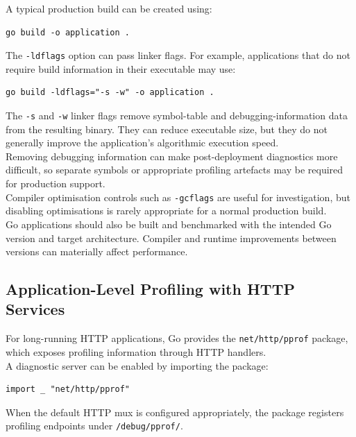 A typical production build can be created using:

\begin{lstlisting}
go build -o application .
\end{lstlisting}

The \texttt{-ldflags} option can pass linker flags. For example, applications that do not require build information in their executable may use:

\begin{lstlisting}
go build -ldflags="-s -w" -o application .
\end{lstlisting}

The \texttt{-s} and \texttt{-w} linker flags remove symbol-table and debugging-information data from the resulting binary. They can reduce executable size, but they do not generally improve the application's algorithmic execution speed.\\

Removing debugging information can make post-deployment diagnostics more difficult, so separate symbols or appropriate profiling artefacts may be required for production support.\\

Compiler optimisation controls such as \texttt{-gcflags} are useful for investigation, but disabling optimisations is rarely appropriate for a normal production build.\\

Go applications should also be built and benchmarked with the intended Go version and target architecture. Compiler and runtime improvements between versions can materially affect performance.

\subsection{Application-Level Profiling with HTTP Services}

For long-running HTTP applications, Go provides the \texttt{net/http/pprof} package, which exposes profiling information through HTTP handlers.\\

A diagnostic server can be enabled by importing the package:

\begin{lstlisting}
import _ "net/http/pprof"
\end{lstlisting}

When the default HTTP mux is configured appropriately, the package registers profiling endpoints under \texttt{/debug/pprof/}.\\

